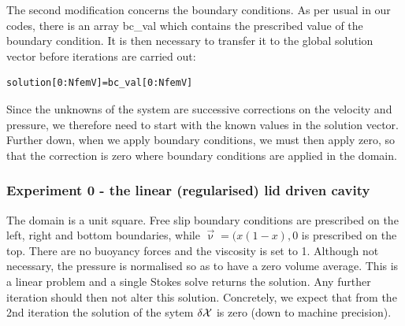 The second modification concerns the boundary conditions. 
As per usual in our codes, there is an array {\codefont bc\_val} 
which contains the prescribed value of the boundary condition.
It is then necessary to transfer it to the global solution vector 
before iterations are carried out:
\begin{lstlisting}
solution[0:NfemV]=bc_val[0:NfemV]
\end{lstlisting}
Since the unknowns of the system are successive corrections on the 
velocity and pressure, we therefore need to start with the known 
values in the solution vector. Further down, when we apply boundary conditions, 
we must then apply zero, so that the correction is zero where 
boundary conditions are applied in the domain.  



\newpage
\subsubsection*{Experiment 0 - the linear (regularised) lid driven cavity}

The domain is a unit square. Free slip boundary conditions are prescribed on the 
left, right and bottom boundaries, while $\vec\upnu=(x(1-x),0$ is prescribed on the 
top. There are no buoyancy forces and the viscosity is set to 1. Although 
not necessary, the pressure is normalised so as to have a zero volume average. 
This is a linear problem and a single Stokes solve returns the solution. Any further 
iteration should then not alter this solution. 
Concretely, we expect that from the 2nd iteration the solution of the sytem $\delta {\cal X}$ 
is zero (down to machine precision).

